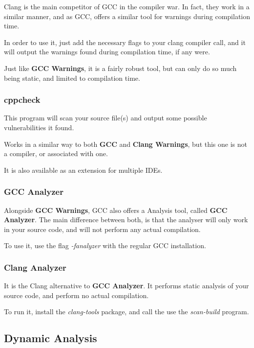 \documentclass{article}
\begin{document}
Clang is the main competitor of GCC in the compiler war. In fact, they work in a similar manner, and as GCC, offers a similar tool for warnings during compilation time.

In order to use it, just add the necessary flags to your clang compiler call, and it will output the warnings found during compilation time, if any were.

Just like \textbf{GCC Warnings}, it is a fairly robust tool, but can only do so much being static, and limited to compilation time.

\subsubsection{cppcheck}

This program will scan your source file(s) and output some possible vulnerabilities it found.

Works in a similar way to both \textbf{GCC} and \textbf{Clang Warnings}, but this one is not a compiler, or associated with one.

It is also available as an extension for multiple IDEs.

\subsubsection{GCC Analyzer}

Alongside \textbf{GCC Warnings}, GCC also offers a Analysis tool, called \textbf{GCC Analyzer}. The main difference between both, is that the analyser will only work in your source code, and will not perform any actual compilation.

To use it, use the flag \textit{-fanalyzer} with the regular GCC installation.

\subsubsection{Clang Analyzer}

It is the Clang alternative to \textbf{GCC Analyzer}. It performs static analysis of your source code, and perform no actual compilation.

To run it, install the \textit{clang-tools} package, and call the use the \textit{scan-build} program.

\subsection{Dynamic Analysis}
\end{document}
